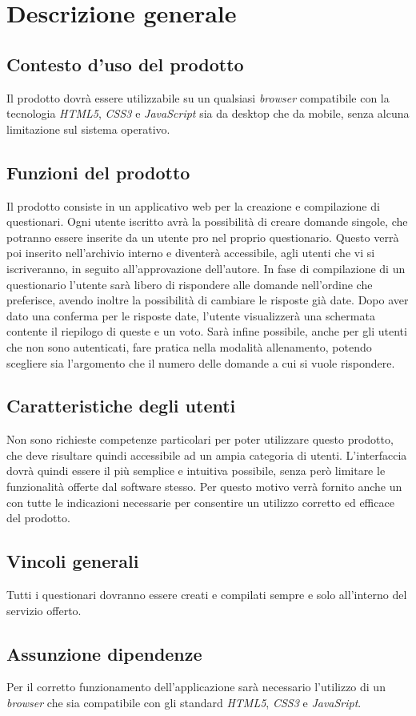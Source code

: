 \newpage
\section{Descrizione generale}
\subsection{Contesto d'uso del prodotto}
Il prodotto dovrà essere utilizzabile su un qualsiasi \textit{browser} compatibile con la tecnologia \textit{HTML5}, \textit{CSS3} e \textit{JavaScript} sia da desktop che da mobile, senza alcuna limitazione sul sistema operativo.

\subsection{Funzioni del prodotto}
Il prodotto consiste in un applicativo web per la creazione e compilazione di questionari. Ogni utente iscritto avrà la possibilità di creare domande singole, che potranno essere inserite da un utente pro nel proprio questionario. Questo verrà poi inserito nell'archivio interno e diventerà accessibile, agli utenti che vi si iscriveranno, in seguito all'approvazione dell'autore. In fase di compilazione di un questionario l'utente sarà libero di rispondere alle domande nell'ordine che preferisce, avendo inoltre la possibilità di cambiare le risposte già date. Dopo aver dato una conferma per le risposte date, l'utente visualizzerà una schermata contente il riepilogo di queste e un voto. Sarà infine possibile, anche per gli utenti che non sono autenticati, fare pratica nella modalità allenamento, potendo scegliere sia l'argomento che il numero delle domande a cui si vuole rispondere.

\subsection{Caratteristiche degli utenti}
Non sono richieste competenze particolari per poter utilizzare questo prodotto, che deve risultare quindi accessibile ad un ampia categoria di utenti. L'interfaccia dovrà quindi essere il più semplice e intuitiva possibile, senza però limitare le funzionalità offerte dal software stesso. Per questo motivo verrà fornito anche un \textit{\MU} con tutte le indicazioni necessarie per consentire un utilizzo corretto ed efficace del prodotto.
\subsection{Vincoli generali}
Tutti i questionari dovranno essere creati e compilati sempre e solo all'interno del servizio offerto.
\subsection{Assunzione dipendenze}
Per il corretto funzionamento dell'applicazione sarà necessario l'utilizzo di un \textit{browser} che sia compatibile con gli standard \textit{HTML5}, \textit{CSS3} e \textit{JavaSript}.

